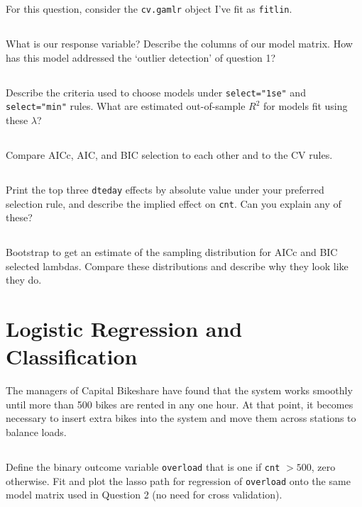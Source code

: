 \documentclass[12pt]{article}
\begin{document}
For this question, consider the {\tt cv.gamlr} object I've fit as  {\tt fitlin}.

\subsection{}
What is our response variable?  Describe the columns of our model matrix.  How has this model addressed the `outlier detection' of question 1?

\subsection{} Describe the criteria used to choose models under {\tt select="1se"} and {\tt select="min"} rules.  What are estimated out-of-sample $R^2$ for models fit using these $\lambda$?

\subsection{} Compare AICc, AIC, and BIC selection to each other and to the CV rules. 

\subsection{} Print the top three {\tt dteday} effects by absolute value under your preferred selection rule, and describe the implied effect on \texttt{cnt}. Can you explain any of these?

\subsection{} Bootstrap to get an estimate of the sampling distribution for AICc and BIC selected lambdas.  Compare these distributions and describe why they look like they do.

\newpage
\section{Logistic Regression and Classification}

The managers of Capital Bikeshare have found that the system works smoothly until more than 500 bikes are rented in any one hour.  At that point, it becomes necessary to insert extra bikes into the system and move them across stations to balance loads.

\subsection{}
Define the binary outcome variable {\tt overload} that is one if \texttt{cnt} $>500$, zero otherwise.  Fit and plot the lasso path for regression of {\tt overload} onto the same model matrix used in Question 2 (no need for cross validation). 
\end{document}
